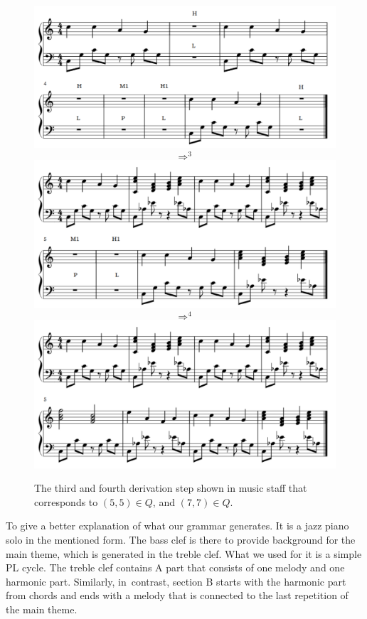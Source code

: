\begin{figure}[H]
\centering
\includegraphics[scale=0.35]{obrazky-figures/der3.pdf}
\[
\Rightarrow^3
\]
\includegraphics[scale=0.35]{obrazky-figures/der4.pdf}
\[
\Rightarrow^4
\]
\includegraphics[scale=0.35]{obrazky-figures/der5.pdf}
\caption{The third and fourth derivation step shown in music staff that corresponds to $(5,5) \in Q$, and $(7,7) \in Q$.}
\label{fig:def1final1}
\end{figure}

To give a better explanation of what our grammar generates. It is a jazz piano solo in the mentioned form. The bass clef is there to provide background for the main theme, which is generated in the treble clef. What we used for it is a simple PL cycle. The treble clef contains A part that consists of one melody and one harmonic part. Similarly, in~contrast, section B starts with the harmonic part from chords and ends with a melody that is connected to the last repetition of the main theme.


